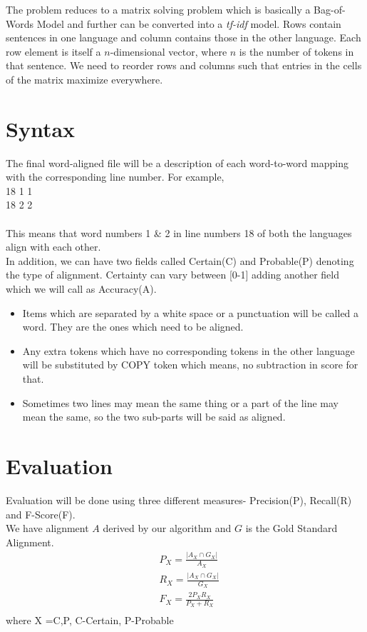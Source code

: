 \documentclass{article}
\begin{document}
The problem reduces to a matrix solving problem which is basically a Bag-of-Words Model and further can be converted into a \emph{tf-idf} model. Rows contain sentences in one language and column contains those in the other language. Each row element is itself a $n$-dimensional vector, where $n$ is the number of tokens in that sentence. We need to reorder rows and columns such that entries in the cells of the matrix maximize everywhere.\\


\section{Syntax}
The final word-aligned file will be a description of each word-to-word mapping with the corresponding line number. For example,\\
18 1 1\\
18 2 2\\\\
This means that word numbers 1 \& 2 in line numbers 18 of both the languages align with each other.\\
In addition, we can have two fields called Certain(C) and Probable(P) denoting the type of alignment. Certainty can vary between [0-1] adding another field which we will call as Accuracy(A).\\
\begin{itemize}
\item Items which are separated by a white space or a punctuation will be called a word. They are the ones which need to be aligned.
\item Any extra tokens which have no corresponding tokens in the other language will be substituted by COPY token which means, no subtraction in score for that.
\item Sometimes two lines may mean the same thing or a part of the line may mean the same, so the two sub-parts will be said as aligned.
\end{itemize}

\section{Evaluation}
Evaluation will be done using three different measures- Precision(P), Recall(R) and F-Score(F).\\
We have alignment $A$ derived by our algorithm and $G$ is the Gold Standard Alignment.
\begin{align*}
&P_X=\frac{|A_X \cap G_X|}{A_X}\\
&R_X=\frac{|A_X \cap G_X|}{G_X}\\
&F_X=\frac{2P_XR_X}{P_X+R_X}\\
\end{align*}
where X ={C,P}, C-Certain, P-Probable\\


\nocite{*}
{}

\end{document}
